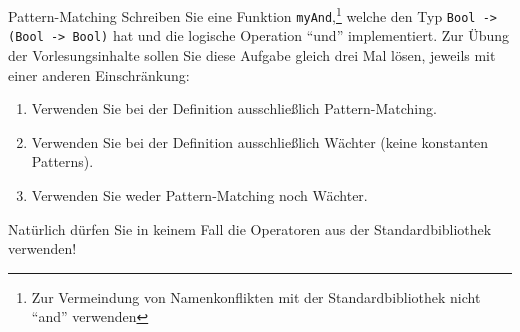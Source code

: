 \documentclass[11pt]{article}
\begin{document}
\begin{aufgabe}{Pattern-Matching}\label{Pattern-Matching}%
  Schreiben Sie eine Funktion \verb|myAnd|,\footnote{Zur Vermeindung von Namenkonflikten mit der Standardbibliothek nicht ``and'' verwenden} 
  welche den Typ \linebreak\verb|Bool -> (Bool -> Bool)| hat
  und die logische Operation ``und'' implementiert.
  Zur Übung der Vorlesungsinhalte sollen Sie diese Aufgabe gleich drei Mal lösen,
  jeweils mit einer anderen Einschränkung:  
  \begin{enumerate}
    \item Verwenden Sie bei der Definition ausschließlich Pattern-Matching.
    \item Verwenden Sie bei der Definition ausschließlich Wächter (keine konstanten Patterns).
    \item Verwenden Sie weder Pattern-Matching noch Wächter.
  \end{enumerate}
  Natürlich dürfen Sie in keinem Fall die Operatoren aus der Standardbibliothek verwenden!
  

\end{aufgabe}
\end{document}
